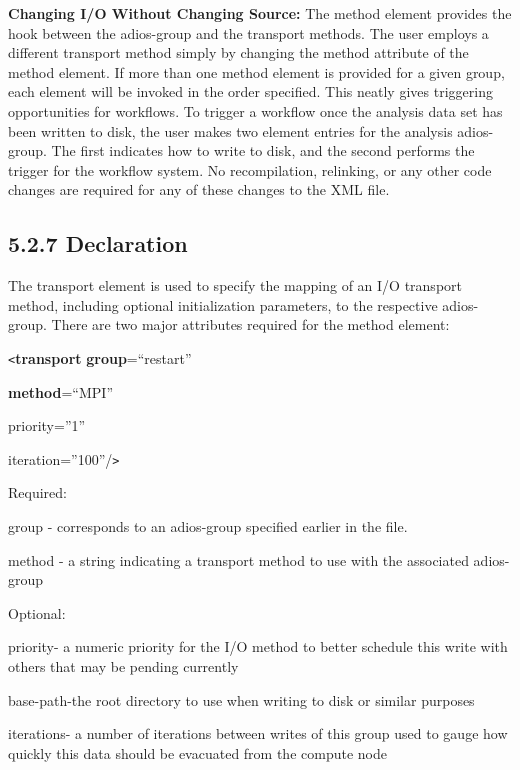\textbf{Changing I/O Without Changing Source:} The method element provides the 
hook between the adios-group and the transport methods. The user employs a different 
transport method simply by changing the method attribute of the method element. 
If more than one method element is provided for a given group, each element will 
be invoked in the order specified. This neatly gives triggering opportunities for 
workflows. To trigger a workflow once the analysis data set has been written to 
disk, the user makes two element entries for the analysis adios-group. The first 
indicates how to write to disk, and the second performs the trigger for the workflow 
system. No recompilation, relinking, or any other code changes are required for 
any of these changes to the XML file.\label{HToc82067523}\label{HToc84890250}\label{HToc212016626}\label{HToc212016868}\label{HToc182553372}

\subsection*{{\large \textbf{5.2.7 Declaration}}}

The transport element is used to specify the mapping of an I/O transport method, 
including optional initialization parameters, to the respective adios-group. There 
are two major attributes required for the method element: 

\texttt{<}\textbf{transport} \textbf{group}=``restart'' 

\leftskip=54pt
\textbf{method}=``MPI''

priority=''1''

iteration=''100''/\texttt{>}

\leftskip=0pt
Required:

\leftskip=18pt
\parindent=3pt
group - corresponds to an adios-group specified earlier in the file.

method - a string indicating a transport method to use with the associated adios-group

\leftskip=0pt
\parindent=0pt
Optional: 

\leftskip=72pt
\parindent=-50pt
priority- a numeric priority for the I/O method to better schedule this write with 
others that may be pending currently

\leftskip=85pt
\parindent=-85pt
base-path-the root directory to use when writing to disk or similar purposes

\parindent=-63pt
iterations- a number of iterations between writes of this group used to gauge how 
quickly this data should be evacuated from the compute node\label{HToc82067524}\label{HToc84890251}\label{HToc212016627}\label{HToc212016869}\label{HToc182553373}

